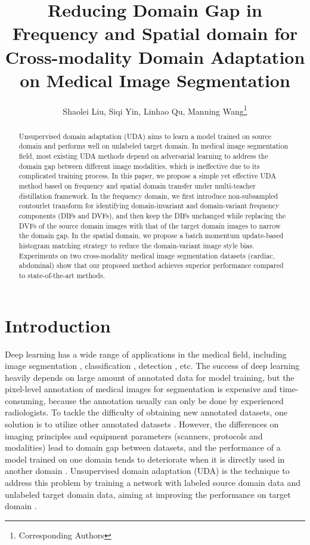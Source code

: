 \documentclass[letterpaper]{article} %
\title{Reducing Domain Gap in Frequency and Spatial domain for Cross-modality Domain Adaptation on Medical Image Segmentation}
\author{
    Shaolei Liu\equalcontrib,
    Siqi Yin\equalcontrib,
    Linhao Qu,
    Manning Wang\thanks{Corresponding Authors}
}
\begin{document}
\maketitle

\begin{abstract}
    Unsupervised domain adaptation (UDA) aims to learn a model trained on source domain and performs well on unlabeled target domain.
    In medical image segmentation field, most existing UDA methods depend on adversarial learning to address the domain gap between different
    image modalities, which is ineffective due to its complicated training process. In this paper, we propose a simple yet effective UDA method
    based on frequency and spatial domain transfer under multi-teacher distillation framework. In the frequency domain, we first introduce
    non-subsampled contourlet transform for identifying domain-invariant and domain-variant frequency components (DIFs and DVFs), and then
    keep the DIFs unchanged while replacing the DVFs of the source domain images with that of the target domain images to narrow the domain
    gap. In the spatial domain, we propose a batch momentum update-based histogram matching strategy to reduce the domain-variant image style bias.
    Experiments on two cross-modality medical image segmentation datasets (cardiac, abdominal) show that our proposed method achieves superior
    performance compared to state-of-the-art methods.
\end{abstract}

\section{Introduction}
Deep learning has a wide range of applications in the medical field, including image segmentation \cite{1,2}, classification \cite{3,4},
detection \cite{5,6}, etc. The success of deep learning heavily depends on large amount of annotated data for model training, but the pixel-level
annotation of medical images for segmentation is expensive and time-consuming, because the annotation usually can only be done by experienced radiologists.
 To tackle the difficulty of obtaining new annotated datasets, one solution is to utilize other annotated datasets \cite{8,9}. However, the
 differences on imaging principles and equipment parameters (scanners, protocols and modalities) lead to
 domain gap between datasets, and the performance of a model trained on one domain tends to deteriorate when it is directly used in another
 domain \cite{2,10,11}. Unsupervised domain adaptation (UDA) is the technique to address this problem by training a network with labeled
 source domain data and unlabeled target domain data, aiming at improving the performance on target domain \cite{12}.
\end{document}

